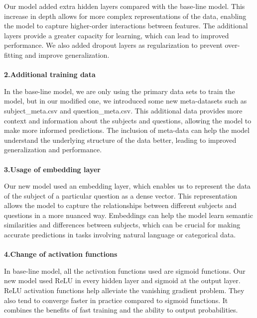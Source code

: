 \documentclass{article}
\begin{document}
Our model added extra hidden layers compared with the base-line model. This increase in depth allows for more complex representations of the data, enabling the model to capture higher-order interactions between features. The additional layers provide a greater capacity for learning, which can lead to improved performance. We also added dropout layers as regularization to prevent over-fitting and improve generalization.\\
\\
\textbf{2.Additional training data}

In the base-line model, we are only using the primary data sets to train the model, but in our modified one, we introduced some new meta-datasets such as subject\_meta.csv and question\_meta.csv. This additional data provides more context and information about the subjects and questions, allowing the model to make more informed predictions. The inclusion of meta-data can help the model understand the underlying structure of the data better, leading to improved generalization and performance.
\\
\\
\textbf{3.Usage of embedding layer}

Our new model used an embedding layer, which enables us to represent the data of the subject of a particular question as a dense vector. This representation allows the model to capture the relationships between different subjects and questions in a more nuanced way. Embeddings can help the model learn semantic similarities and differences between subjects, which can be crucial for making accurate predictions in tasks involving natural language or categorical data.
\\
\\
\textbf{4.Change of activation functions}

In base-line model, all the activation functions used are sigmoid functions. Our new model used ReLU in every hidden layer and sigmoid at the output layer. ReLU activation functions help alleviate the vanishing gradient problem. They also tend to converge faster in practice compared to sigmoid functions. It combines the benefits of fast training and the ability to output probabilities.
\end{document}
